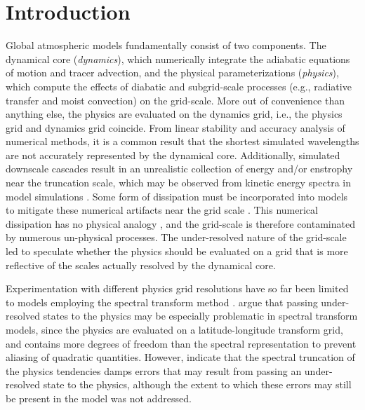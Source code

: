 \documentclass{agujournal}
\begin{document}

\section{Introduction}

Global atmospheric models fundamentally consist of two components. The dynamical core ({\em{dynamics}}), which numerically integrate the adiabatic equations of motion and tracer advection, and the physical parameterizations ({\em{physics}}), which compute the effects of diabatic and subgrid-scale processes (e.g., radiative transfer and moist convection) on the grid-scale. More out of convenience than anything else, the physics are evaluated on the dynamics grid, i.e., the physics grid and dynamics grid coincide. From linear stability and accuracy analysis of numerical methods, it is a common result that the shortest simulated wavelengths are not accurately represented by the dynamical core. Additionally, simulated downscale cascades result in an unrealistic collection of energy and/or enstrophy near the truncation scale, which may be observed from kinetic energy spectra in model simulations \citep{S2011LNCSE}. Some form of dissipation must be incorporated into models to mitigate these numerical artifacts near the grid scale \citep{JW2010LNCSE}. This numerical dissipation has no physical analogy \citep[although see][]{GMR2007}, and the grid-scale is therefore contaminated by numerous un-physical processes. The under-resolved nature of the grid-scale led \cite{LH1997MWR} to speculate whether the physics should be evaluated on a grid that is more reflective of the scales actually resolved by the dynamical core.

Experimentation with different physics grid resolutions have so far been limited to models employing the spectral transform method \citep{LH1997MWR,W1999T,W2014PTRSL}. \cite{LH1997MWR} argue that passing under-resolved states to the physics may be especially problematic in spectral transform models, since the physics are evaluated on a latitude-longitude transform grid, and contains more degrees of freedom than the spectral representation to prevent aliasing of quadratic quantities. However, \cite{LH1997MWR} indicate that the spectral truncation of the physics tendencies damps errors that may result from passing an under-resolved state to the physics, although the extent to which these errors may still be present in the model was not addressed. 
\end{document}
